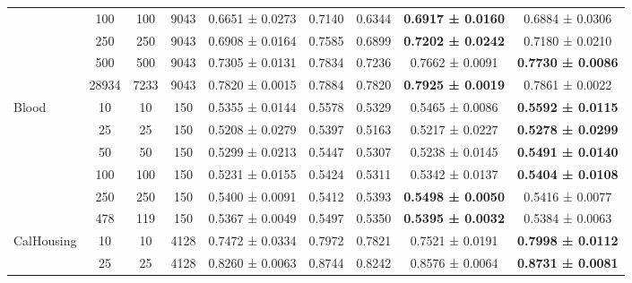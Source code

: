 \begin{table}
{\begin{tabular}[H]{@{}lcccccccc@{}}
                              & 100   & 100  & 9043 & 0.6651 ± 0.0273      & 0.7140               & 0.6344          & \textbf{0.6917 ± 0.0160} & 0.6884 ± 0.0306          \\
                              & 250   & 250  & 9043 & 0.6908 ± 0.0164      & 0.7585               & 0.6899          & \textbf{0.7202 ± 0.0242} & 0.7180 ± 0.0210          \\
                              & 500   & 500  & 9043 & 0.7305 ± 0.0131      & 0.7834               & 0.7236          & 0.7662 ± 0.0091          & \textbf{0.7730 ± 0.0086} \\
                              & 28934 & 7233 & 9043 & 0.7820 ± 0.0015      & 0.7884               & 0.7820          & \textbf{0.7925 ± 0.0019} & 0.7861 ± 0.0022          \\
                              \midrule
\multirow{6}{*}{Blood}        & 10    & 10   & 150  & 0.5355 ± 0.0144      & 0.5578               & 0.5329          & 0.5465 ± 0.0086          & \textbf{0.5592 ± 0.0115} \\
                              & 25    & 25   & 150  & 0.5208 ± 0.0279      & 0.5397               & 0.5163          & 0.5217 ± 0.0227          & \textbf{0.5278 ± 0.0299} \\
                              & 50    & 50   & 150  & 0.5299 ± 0.0213      & 0.5447               & 0.5307          & 0.5238 ± 0.0145          & \textbf{0.5491 ± 0.0140} \\
                              & 100   & 100  & 150  & 0.5231 ± 0.0155      & 0.5424               & 0.5311          & 0.5342 ± 0.0137          & \textbf{0.5404 ± 0.0108} \\
                              & 250   & 250  & 150  & 0.5400 ± 0.0091      & 0.5412               & 0.5393          & \textbf{0.5498 ± 0.0050} & 0.5416 ± 0.0077          \\
                              & 478   & 119  & 150  & 0.5367 ± 0.0049      & 0.5497               & 0.5350          & \textbf{0.5395 ± 0.0032} & 0.5384 ± 0.0063          \\
                              \midrule
\multirow{7}{*}{CalHousing}   & 10    & 10   & 4128 & 0.7472 ± 0.0334      & 0.7972               & 0.7821          & 0.7521 ± 0.0191          & \textbf{0.7998 ± 0.0112} \\
                              & 25    & 25   & 4128 & 0.8260 ± 0.0063      & 0.8744               & 0.8242          & 0.8576 ± 0.0064          & \textbf{0.8731 ± 0.0081} \\

\end{tabular}}
\end{table}
